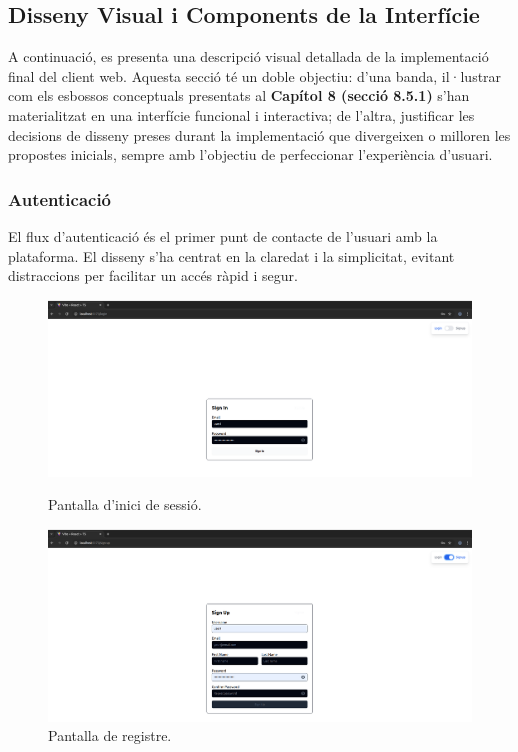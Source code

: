 \subsection{Disseny Visual i Components de la Interfície}
A continuació, es presenta una descripció visual detallada de la implementació final del client web. Aquesta secció té un doble objectiu: d'una banda, il·lustrar com els esbossos conceptuals presentats al \textbf{Capítol 8 (secció 8.5.1)} s'han materialitzat en una interfície funcional i interactiva; de l'altra, justificar les decisions de disseny preses durant la implementació que divergeixen o milloren les propostes inicials, sempre amb l'objectiu de perfeccionar l'experiència d'usuari.

\subsubsection{Autenticació}
El flux d'autenticació és el primer punt de contacte de l'usuari amb la plataforma. El disseny s'ha centrat en la claredat i la simplicitat, evitant distraccions per facilitar un accés ràpid i segur.

\begin{figure}[H]
    \centering
    \begin{minipage}{0.48\textwidth}
        \centering
        \includegraphics[width=\linewidth]{Figures/ui-web/login.png}
        \caption{Pantalla d'inici de sessió.}
        \label{fig:react-login-impl}
    \end{minipage}\hfill
    \begin{minipage}{0.48\textwidth}
        \centering
        \includegraphics[width=\linewidth]{Figures/ui-web/register.png}
        \caption{Pantalla de registre.}
        \label{fig:react-registre-impl}
    \end{minipage}
\end{figure}

